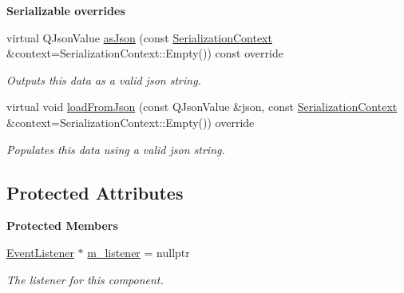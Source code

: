 \begin{Indent}\textbf{ Serializable overrides}\par
\begin{DoxyCompactItemize}
\item 
\mbox{\label{classrev_1_1_listener_component_acd83478862f05a9fe7e49ef05a1ba00a}} 
virtual Q\+Json\+Value \mbox{\hyperlink{classrev_1_1_listener_component_acd83478862f05a9fe7e49ef05a1ba00a}{as\+Json}} (const \mbox{\hyperlink{structrev_1_1_serialization_context}{Serialization\+Context}} \&context=Serialization\+Context\+::\+Empty()) const override
\begin{DoxyCompactList}\small\item\em Outputs this data as a valid json string. \end{DoxyCompactList}\item 
\mbox{\label{classrev_1_1_listener_component_a9fe722238d9f5ccbf595486f418ac25a}} 
virtual void \mbox{\hyperlink{classrev_1_1_listener_component_a9fe722238d9f5ccbf595486f418ac25a}{load\+From\+Json}} (const Q\+Json\+Value \&json, const \mbox{\hyperlink{structrev_1_1_serialization_context}{Serialization\+Context}} \&context=Serialization\+Context\+::\+Empty()) override
\begin{DoxyCompactList}\small\item\em Populates this data using a valid json string. \end{DoxyCompactList}\end{DoxyCompactItemize}
\end{Indent}
\subsection*{Protected Attributes}
\begin{Indent}\textbf{ Protected Members}\par
\begin{DoxyCompactItemize}
\item 
\mbox{\label{classrev_1_1_listener_component_a3c5d050b1ad000c7adf09f616e7462e2}} 
\mbox{\hyperlink{classrev_1_1_event_listener}{Event\+Listener}} $\ast$ \mbox{\hyperlink{classrev_1_1_listener_component_a3c5d050b1ad000c7adf09f616e7462e2}{m\+\_\+listener}} = nullptr
\begin{DoxyCompactList}\small\item\em The listener for this component. \end{DoxyCompactList}\end{DoxyCompactItemize}
\end{Indent}
